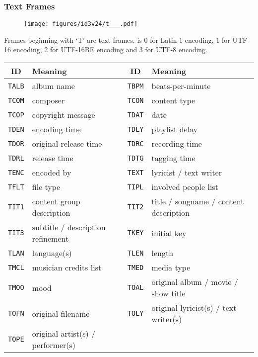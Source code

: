 \clearpage

\subsubsection{Text Frames}
\begin{figure}[h]
  \texttt{[image: figures/id3v24/t\_\_\_.pdf]}
\end{figure}
\par
\noindent
Frames beginning with `T' are text frames.
 is 0 for Latin-1 encoding, 1 for UTF-16 encoding,
2 for UTF-16BE encoding and 3 for UTF-8 encoding.
\begin{table}[h]
  {
    \begin{tabular}{|c|l||c|l|}
      \hline
      ID & Meaning & ID & Meaning \\
      \hline
      \texttt{TALB} & album name &
      \texttt{TBPM} & beats-per-minute \\
      \texttt{TCOM} & composer &
      \texttt{TCON} & content type \\
      \texttt{TCOP} & copyright message &
      \texttt{TDAT} & date \\
      \texttt{TDEN} & encoding time &
      \texttt{TDLY} & playlist delay \\
      \texttt{TDOR} & original release time &
      \texttt{TDRC} & recording time \\
      \texttt{TDRL} & release time &
      \texttt{TDTG} & tagging time \\
      \texttt{TENC} & encoded by &
      \texttt{TEXT} & lyricist / text writer \\
      \texttt{TFLT} & file type &
      \texttt{TIPL} & involved people list \\
      \texttt{TIT1} & content group description &
      \texttt{TIT2} & title / songname / content description \\
      \texttt{TIT3} & subtitle / description refinement &
      \texttt{TKEY} & initial key \\
      \texttt{TLAN} & language(s) &
      \texttt{TLEN} & length \\
      \texttt{TMCL} & musician credits list &
      \texttt{TMED} & media type \\
      \texttt{TMOO} & mood &
      \texttt{TOAL} & original album / movie / show title \\
      \texttt{TOFN} & original filename &
      \texttt{TOLY} & original lyricist(s) / text writer(s) \\
      \texttt{TOPE} & original artist(s) / performer(s) &

\end{tabular}}
\end{table}
